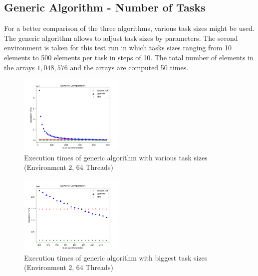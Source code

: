\subsection{Generic Algorithm - Number of Tasks}
For a better comparison of the three algorithms, various task sizes might be used.
The generic algorithm allows to adjust task sizes by parameters.
The second environment is taken for this test run in which tasks sizes ranging from 10 elements to 500 elements per task in steps of 10.
The total number of elements in the arrays \(1,048,576\) and the arrays are computed 50 times.
\begin{figure}[h]
	\centering
	\includegraphics[width=0.45\textwidth]{figures/genericComp.png}
	\caption{Execution times of generic algorithm with various task sizes (Environment 2, 64 Threads)}
	\label{fig:genComp}
\end{figure}

\begin{figure}[h]
	\centering
	\includegraphics[width=0.45\textwidth]{figures/genericCompLast.png}
	\caption{Execution times of generic algorithm with biggest task sizes (Environment 2, 64 Threads)}
	\label{fig:genComp_Last}
\end{figure}

